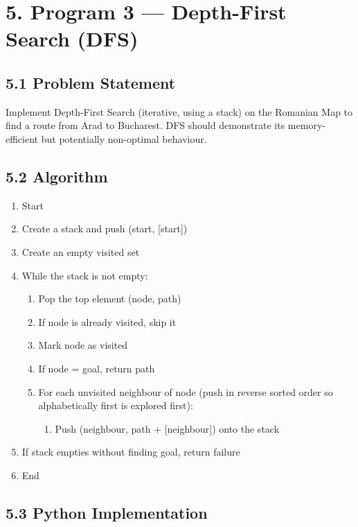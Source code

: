 \documentclass[12pt,a4paper]{article}
\begin{document}
\section*{5. Program 3 --- Depth-First Search (DFS)}

\subsection*{5.1 Problem Statement}

Implement Depth-First Search (iterative, using a stack) on the Romanian Map to find a route from Arad to Bucharest. DFS should demonstrate its memory-efficient but potentially non-optimal behaviour.

\subsection*{5.2 Algorithm}

\begin{enumerate}[leftmargin=1.6em]
  \item Start
  \item Create a stack and push (start, [start])
  \item Create an empty visited set
  \item While the stack is not empty:
  \begin{enumerate}[leftmargin=1.6em,label=(\alph*)]
    \item Pop the top element (node, path)
    \item If node is already visited, skip it
    \item Mark node as visited
    \item If node = goal, return path
    \item For each unvisited neighbour of node (push in reverse sorted order so alphabetically first is explored first):
    \begin{enumerate}[leftmargin=1.6em,label=\roman*.]
      \item Push (neighbour, path + [neighbour]) onto the stack
    \end{enumerate}
  \end{enumerate}
  \item If stack empties without finding goal, return failure
  \item End
\end{enumerate}

\subsection*{5.3 Python Implementation}
\end{document}
